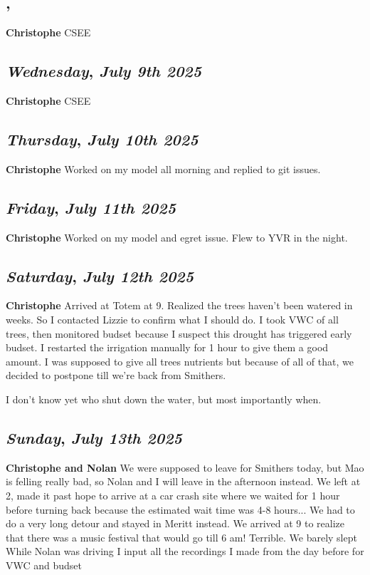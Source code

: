 \subsection*{\weekday, \day}
\textbf {Christophe}
CSEE

\def\day{\textit{July 9th 2025}}
\def\weekday{\textit{Wednesday}}
\subsection*{\weekday, \day}
\textbf {Christophe}
CSEE

\def\day{\textit{July 10th 2025}}
\def\weekday{\textit{Thursday}}
\subsection*{\weekday, \day}
\textbf {Christophe}
Worked on my model all morning and replied to git issues. 

\def\day{\textit{July 11th 2025}}
\def\weekday{\textit{Friday}}
\subsection*{\weekday, \day}
\textbf {Christophe}
Worked on my model and egret issue. Flew to YVR in the night.

\def\day{\textit{July 12th 2025}}
\def\weekday{\textit{Saturday}}
\subsection*{\weekday, \day}
\textbf {Christophe}
Arrived at Totem at 9. Realized the trees haven't been watered in weeks. So I contacted Lizzie to confirm what I should do. I took VWC of all trees, then monitored budset because I suspect this drought has triggered early budset. I restarted the irrigation manually for 1 hour to give them a good amount. I was supposed to give all trees nutrients but because of all of that, we decided to postpone till we're back from Smithers.

I don't know yet who shut down the water, but most importantly when.

\def\day{\textit{July 13th 2025}}
\def\weekday{\textit{Sunday}}
\subsection*{\weekday, \day}
\textbf {Christophe and Nolan}
We were supposed to leave for Smithers today, but Mao is felling really bad, so Nolan and I will leave in the afternoon instead. 
We left at 2, made it past hope to arrive at a car crash site where we waited for 1 hour before turning back because the estimated wait time was 4-8 hours... We had to do a very long detour and stayed in Meritt instead. We arrived at 9 to realize that there was a music festival that would go till 6 am! Terrible. We barely slept
While Nolan was driving I input all the recordings I made from the day before for VWC and budset
\def\day{\textit{July 14th 2025}}
\def\weekday{\textit{Monday}}

